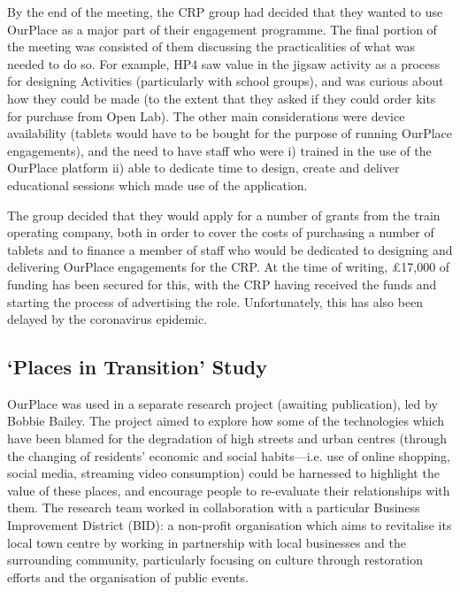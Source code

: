 By the end of the meeting, the CRP group had decided that they wanted to use OurPlace as a major part of their engagement programme. The final portion of the meeting was consisted of them discussing the practicalities of what was needed to do so. For example, HP4 saw value in the jigsaw activity as a process for designing Activities (particularly with school groups), and was curious about how they could be made (to the extent that they asked if they could order kits for purchase from Open Lab). The other main considerations were device availability (tablets would have to be bought for the purpose of running OurPlace engagements), and the need to have staff who were i) trained in the use of the OurPlace platform ii) able to dedicate time to design, create and deliver educational sessions which made use of the application.

The group decided that they would apply for a number of grants from the train operating company, both in order to cover the costs of purchasing a number of tablets and to finance a member of staff who would be dedicated to designing and delivering OurPlace engagements for the CRP. At the time of writing, £17,000 of funding has been secured for this, with the CRP having received the funds and starting the process of advertising the role. Unfortunately, this has also been delayed by the coronavirus epidemic.

\subsection{`Places in Transition' Study}
\label{sec:PlacesInTransition}

OurPlace was used in a separate research project (awaiting publication), led by Bobbie Bailey. The project aimed to explore how some of the technologies which have been blamed for the degradation of high streets and urban centres (through the changing of residents' economic and social habits---i.e. use of online shopping, social media, streaming video consumption) could be harnessed to highlight the value of these places, and encourage people to re-evaluate their relationships with them. The research team worked in collaboration with a particular Business Improvement District (BID): a non-profit organisation which aims to revitalise its local town centre by working in partnership with local businesses and the surrounding community, particularly focusing on culture through restoration efforts and the organisation of public events.

